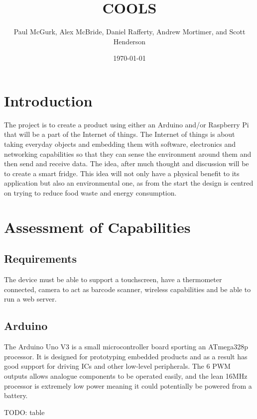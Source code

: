 \documentclass[10pt]{article}
\title{COOLS}
\author{Paul McGurk, Alex McBride, Daniel Rafferty, Andrew Mortimer, and Scott Henderson}
\date{\today}
\begin{document}
\begin{titlepage}
\maketitle
\end{titlepage}

\linespread{1.15} %

\section{Introduction}

The project is to create a product using either an Arduino and/or Raspberry Pi that will be a part of the Internet of things. The Internet of things is about taking everyday objects and embedding them with software, electronics and networking capabilities so that they can sense the environment around them and then send and receive data. The idea, after much thought and discussion will be to create a smart fridge. This idea will not only have a physical benefit to its application but also an environmental one, as from the start the design is centred on trying to reduce food waste and energy consumption.

\newpage
\section{Assessment of Capabilities}

\subsection{Requirements}

The device must be able to support a touchscreen, have a thermometer connected, camera to act as barcode scanner, wireless capabilities and be able to run a web server.

\subsection{Arduino}
The Arduino Uno V3 is a small microcontroller board sporting an ATmega328p processor. It is designed for prototyping embedded products and as a result has good support for driving ICs and other low-level peripherals. The 6 PWM outputs allows analogue components to be operated easily, and the lean 16MHz processor is extremely low power meaning it could potentially be powered from a battery.

TODO: table
\end{document}
